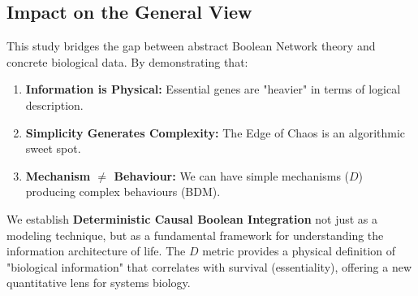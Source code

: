 \documentclass{article}
\begin{document}
\subsection{Impact on the General View}
This study bridges the gap between abstract Boolean Network theory and concrete biological data. By demonstrating that:
\begin{enumerate}
    \item \textbf{Information is Physical:} Essential genes are "heavier" in terms of logical description.
    \item \textbf{Simplicity Generates Complexity:} The Edge of Chaos is an algorithmic sweet spot.
    \item \textbf{Mechanism $\neq$ Behaviour:} We can have simple mechanisms ($D$) producing complex behaviours (BDM).
\end{enumerate}

We establish \textbf{Deterministic Causal Boolean Integration} not just as a modeling technique, but as a fundamental framework for understanding the information architecture of life. The $D$ metric provides a physical definition of "biological information" that correlates with survival (essentiality), offering a new quantitative lens for systems biology.
\end{document}
